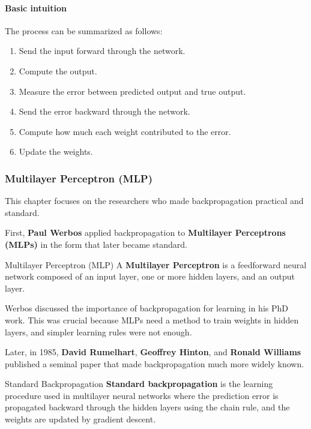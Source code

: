 \documentclass[11pt]{article}
\theoremstyle{smallexample}
\begin{document}
\paragraph{Basic intuition}
The process can be summarized as follows:
\begin{enumerate}
    \item Send the input forward through the network.
    \item Compute the output.
    \item Measure the error between predicted output and true output.
    \item Send the error backward through the network.
    \item Compute how much each weight contributed to the error.
    \item Update the weights.
\end{enumerate}


\subsubsection{Multilayer Perceptron (MLP)}

This chapter focuses on the researchers who made backpropagation practical and standard.

First, \textbf{Paul Werbos} applied backpropagation to \textbf{Multilayer Perceptrons (MLPs)} in the form that later became standard.

\begin{defbox}{Multilayer Perceptron (MLP)}
A \textbf{Multilayer Perceptron} is a feedforward neural network composed of an input layer, one or more hidden layers, and an output layer.
\end{defbox}

Werbos discussed the importance of backpropagation for learning in his PhD work. This was crucial because MLPs need a method to train weights in hidden layers, and simpler learning rules were not enough.

Later, in 1985, \textbf{David Rumelhart}, \textbf{Geoffrey Hinton}, and \textbf{Ronald Williams} published a seminal paper that made backpropagation much more widely known.

\begin{defbox}{Standard Backpropagation}
\textbf{Standard backpropagation} is the learning procedure used in multilayer neural networks where the prediction error is propagated backward through the hidden layers using the chain rule, and the weights are updated by gradient descent.
\end{defbox}
\end{document}
